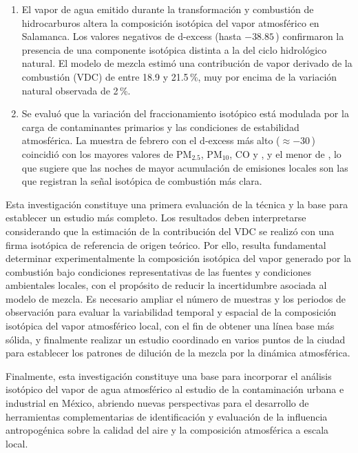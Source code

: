 \begin{enumerate}
  \item El vapor de agua emitido durante la transformación y 
  combustión de hidrocarburos altera la composición isotópica del 
  vapor atmosférico en Salamanca. Los valores negativos de d-excess 
  (hasta $-38.85$\,\textperthousand) confirmaron la presencia de una 
  componente isotópica distinta a la del ciclo hidrológico natural. 
  El modelo de mezcla estimó una contribución de vapor derivado de la 
  combustión (VDC) de entre 18.9 y 21.5\,\%, muy por encima de la 
  variación natural observada de 2\,\%.

  \item Se evaluó que la variación del fraccionamiento isotópico 
  está modulada por la carga de contaminantes primarios y las 
  condiciones de estabilidad atmosférica. La muestra de febrero 
  con el d-excess más alto ($\approx -30$\,\textperthousand) 
  coincidió con los mayores valores de $\mathrm{PM}_{2.5}$, $\mathrm{PM}_{10}$, 
  CO y , y el menor de , lo que sugiere que las noches de 
  mayor acumulación de emisiones locales son las que registran la señal 
  isotópica de combustión más clara.
\end{enumerate}

Esta investigación constituye una primera evaluación de la técnica y 
la base para establecer un estudio más completo. Los resultados 
deben interpretarse considerando que la estimación de la contribución 
del VDC se realizó con una firma isotópica de referencia de origen 
teórico. Por ello, resulta fundamental determinar experimentalmente 
la composición isotópica del vapor generado por la combustión bajo 
condiciones representativas de las fuentes y condiciones ambientales 
locales, con el propósito de reducir la incertidumbre asociada al 
modelo de mezcla. Es necesario ampliar el número de muestras y los 
periodos de observación para evaluar la variabilidad temporal y 
espacial de la composición isotópica del vapor atmosférico local, 
con el fin de obtener una línea base más sólida, y finalmente 
realizar un estudio coordinado en varios puntos de la ciudad para 
establecer los patrones de dilución de la mezcla por la dinámica atmosférica.

Finalmente, esta investigación constituye una base para incorporar 
el análisis isotópico del vapor de agua atmosférico al estudio de la 
contaminación urbana e industrial en México, abriendo nuevas 
perspectivas para el desarrollo de herramientas complementarias 
de identificación y evaluación de la influencia antropogénica 
sobre la calidad del aire y la composición atmosférica a escala local.